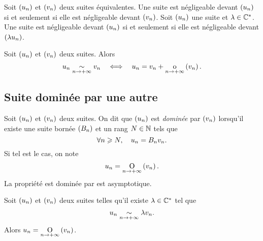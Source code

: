 \documentclass{magnolia}
\begin{document}
\begin{remarques}
\remarque Soit $\left(u_n\right)$ et $\left(v_n\right)$ deux suites équivalentes. Une suite est
  négligeable devant $\left(u_n\right)$ si et seulement si elle est négligeable
  devant $\left(v_n\right)$.
\remarque Soit $\left(u_n\right)$ une suite et $\lambda\in\mathbb{C}^*$. Une suite est négligeable
  devant $\left(u_n\right)$ si et seulement si elle est négligeable devant
  $\left(\lambda u_n\right)$.
\end{remarques}

\begin{proposition}[utile=-3]
Soit $\left(u_n\right)$ et $\left(v_n\right)$ deux suites. Alors
\[u_n \underset{n\rightarrow +\infty}{\sim} v_n \quad\Longleftrightarrow\quad u_n=v_n+\underset{n \rightarrow +\infty}{\text{o}}\left(v_n\right).\]
\end{proposition}




  
\subsection{Suite dominée par une autre}

\begin{definition}[utile=-3]
Soit $\left(u_n\right)$ et $\left(v_n\right)$ deux suites. On dit que $\left(u_n\right)$ est \emph{dominée} par
$\left(v_n\right)$ lorsqu'il existe une suite bornée $\left(B_n\right)$ et un rang $N\in\mathbb{N}$ tels que
\[\forall n\geqslant N ,\quad u_n=B_n v_n.\]
Si tel est le cas, on note
\[u_n=\underset{n \rightarrow +\infty}{\text{O}}\left(v_n\right).\]
La propriété \og est dominée par \fg est asymptotique.
\end{definition}

\begin{remarqueUnique}
\remarque Soit $\left(u_n\right)$ et $\left(v_n\right)$ deux suites telles qu'il existe $\lambda\in\mathbb{C}^*$ tel que
\[u_n\underset{n\rightarrow +\infty}{\sim}\lambda v_n.\]
Alors $u_n=\underset{n \rightarrow +\infty}{\text{O}}\left(v_n\right)$.
\end{remarqueUnique}
\end{document}
